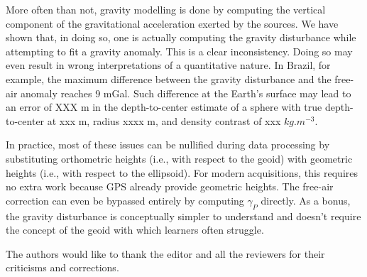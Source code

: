 \documentclass[extra]{gji}
\begin{document}
More often than not, gravity modelling is done by computing the
vertical component of the gravitational acceleration exerted by the sources.
We have shown that, in doing so, one is actually computing the gravity
disturbance while attempting to fit a gravity anomaly.
This is a clear inconsistency.
Doing so may even result in wrong interpretations of a quantitative nature.
In Brazil, for example, the maximum difference
between the gravity disturbance and the free-air anomaly reaches 9 mGal.
Such difference at the Earth's surface may lead to
an error of XXX m in the depth-to-center estimate of a sphere with
true depth-to-center at xxx m, radius xxxx m, and density
contrast of xxx $kg.m^{-3}$.

In practice, most of these issues can be nullified during data processing by
substituting orthometric heights (i.e., with respect to the geoid) with
geometric heights (i.e., with respect to the ellipsoid).
For modern acquisitions, this requires no extra work because GPS already
provide geometric heights.
The free-air correction can even be bypassed entirely by computing $\gamma_P$
directly.
As a bonus, the gravity disturbance is conceptually simpler to understand and
doesn't require the concept of the geoid with which learners often struggle.


\begin{acknowledgments}
The authors would like to thank the editor and all the
reviewers for their criticisms and corrections.
\end{acknowledgments}





\appendix
%
%
%
%
\end{document}
